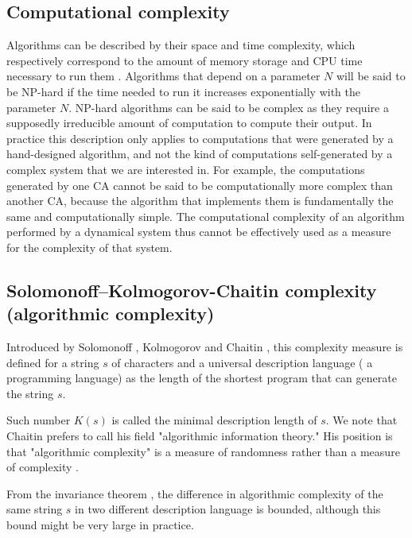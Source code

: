 \subsection{Computational complexity}
Algorithms can be described by their space and time complexity, which
respectively correspond to the amount of memory storage and CPU time necessary
to run them \parencite{traubInformationUncertaintyComplexity1983,
  packelRecentDevelopmentsInformationbased1987,
  hopcroftIntroductionAutomataTheory2007}. Algorithms that depend on a parameter
$N$ will be said to be NP-hard if the time needed to run it increases
exponentially with the parameter $N$. NP-hard algorithms can be said to be
complex as they require a supposedly irreducible amount of computation to
compute their output. In practice this description only applies to computations
that were generated by a hand-designed algorithm, and not the kind of
computations self-generated by a complex system that we are interested in. For
example, the computations generated by one \ac{CA} cannot be said to be
computationally more complex than another \ac{CA}, because the algorithm that
implements them is fundamentally the same and computationally simple. The
computational complexity of an algorithm performed by a dynamical system thus
cannot be effectively used as a measure for the complexity of that system.

\subsection{Solomonoff–Kolmogorov-Chaitin complexity (algorithmic
  complexity)}

Introduced by Solomonoff \parencite{solomonoffPreliminaryReportGeneral1960},
Kolmogorov \parencite{kolmogorovThreeApproachesQuantitative1968} and Chaitin
\parencite{chaitinLengthProgramsComputing1969,
  chaitinAlgorithmicInformationTheory1977,
  chaitinInformationRandomnessIncompleteness1990}, this complexity measure is
defined for a string $s$ of characters and a universal description language (\eg
a programming language) as the length of the shortest program that can generate
the string $s$.

Such number $K(s)$ is called the minimal description length of
$s$. We note that Chaitin prefers to call his field "algorithmic information
theory." His position is that "algorithmic complexity" is a measure of
randomness rather than a measure of complexity
\parencite{chaitinInformationRandomnessIncompleteness1990}.

From the invariance theorem \parencite{solomonoffFormalTheoryInductive1964,
  solomonoffFormalTheoryInductive1964a,
  kolmogorovThreeApproachesQuantitative1968,
  chaitinLengthProgramsComputing1969}, the difference in algorithmic complexity
of the same string $s$ in two different description language is bounded,
although this bound might be very large in practice.

